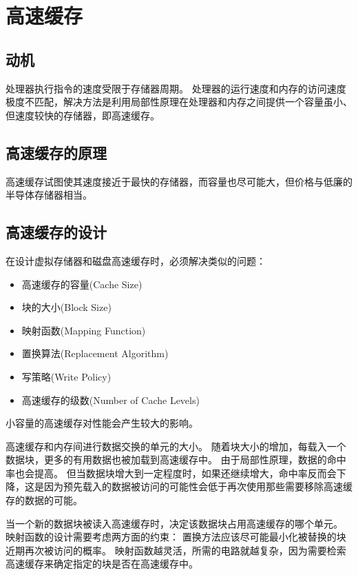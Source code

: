 
\section{高速缓存}
{
    \subsection{动机}
    {
        处理器执行指令的速度受限于存储器周期。
        处理器的运行速度和内存的访问速度极度不匹配，解决方法是利用局部性原理在处理器和内存之间提供一个容量虽小、但速度较快的存储器，即高速缓存。
    }

    \subsection{高速缓存的原理}
    {
        高速缓存试图使其速度接近于最快的存储器，而容量也尽可能大，但价格与低廉的半导体存储器相当。
    }

    \subsection{高速缓存的设计}
    {
        在设计虚拟存储器和磁盘高速缓存时，必须解决类似的问题：

        \begin{itemize}
            \item 高速缓存的容量(Cache Size)
            \item 块的大小(Block Size)
            \item 映射函数(Mapping Function)
            \item 置换算法(Replacement Algorithm)
            \item 写策略(Write Policy)
            \item 高速缓存的级数(Number of Cache Levels)
        \end{itemize}

        小容量的高速缓存对性能会产生较大的影响。

        高速缓存和内存间进行数据交换的单元的大小。
        随着块大小的增加，每载入一个数据块，更多的有用数据也被加载到高速缓存中。
        由于局部性原理，数据的命中率也会提高。
        但当数据块增大到一定程度时，如果还继续增大，命中率反而会下降，这是因为预先载入的数据被访问的可能性会低于再次使用那些需要移除高速缓存的数据的可能。

        当一个新的数据块被读入高速缓存时，决定该数据块占用高速缓存的哪个单元。
        映射函数的设计需要考虑两方面的约束：
        置换方法应该尽可能最小化被替换的块近期再次被访问的概率。
        映射函数越灵活，所需的电路就越复杂，因为需要检索高速缓存来确定指定的块是否在高速缓存中。

}}
